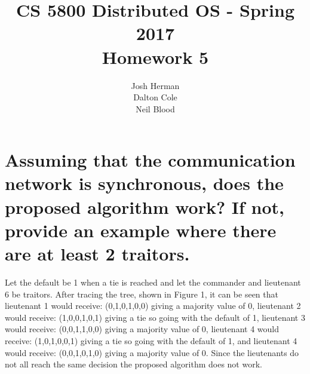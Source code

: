 \documentclass[times]{article}
\begin{document}
	\title{CS 5800 Distributed OS - Spring 2017 \\ Homework 5}
	\author{Josh Herman \\ Dalton Cole \\ Neil Blood}
	\date{}
	\maketitle

	\section{Assuming that the communication network is synchronous, does the proposed algorithm work? If not, provide an example where there are at least 2 traitors.}
		Let the default be 1 when a tie is reached and let the commander and lieutenant 6 be traitors. After tracing the tree, shown in Figure 1, it can be seen that lieutenant 1 would receive: (0,1,0,1,0,0) giving a majority value of 0, lieutenant 2 would receive: (1,0,0,1,0,1) giving a tie so going with the default of 1, lieutenant 3 would receive: (0,0,1,1,0,0) giving a majority value of 0, lieutenant 4 would receive: (1,0,1,0,0,1) giving a tie so going with the default of 1, and lieutenant 4 would receive: (0,0,1,0,1,0) giving a majority value of 0. Since the lieutenants do not all reach the same decision the proposed algorithm does not work.
		
\end{document}
